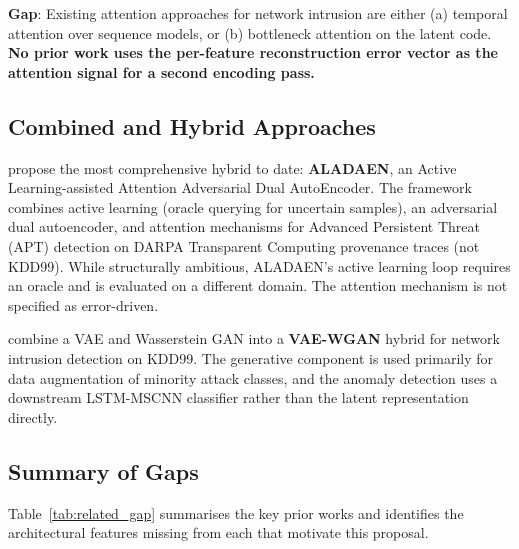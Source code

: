 \documentclass[12pt,a4paper]{article}
\begin{document}
\textbf{Gap}: Existing attention approaches for network intrusion are either
(a) temporal attention over sequence models, or (b) bottleneck attention on
the latent code. \textbf{No prior work uses the per-feature reconstruction
error vector as the attention signal for a second encoding pass.}

\subsection{Combined and Hybrid Approaches}

\citet{aladaen} propose the most comprehensive hybrid to date:
\textbf{ALADAEN}, an Active Learning-assisted Attention Adversarial Dual
AutoEncoder. The framework combines active learning (oracle querying for
uncertain samples), an adversarial dual autoencoder, and attention mechanisms
for Advanced Persistent Threat (APT) detection on DARPA Transparent Computing
provenance traces (not KDD99). While structurally ambitious, ALADAEN's active
learning loop requires an oracle and is evaluated on a different domain. The
attention mechanism is not specified as error-driven.

\citet{vae_wgan} combine a VAE and Wasserstein GAN into a
\textbf{VAE-WGAN} hybrid for network intrusion detection on KDD99. The
generative component is used primarily for data augmentation of minority
attack classes, and the anomaly detection uses a downstream LSTM-MSCNN
classifier rather than the latent representation directly.

\subsection{Summary of Gaps}

Table~\ref{tab:related_gap} summarises the key prior works and identifies the
architectural features missing from each that motivate this proposal.
\end{document}
